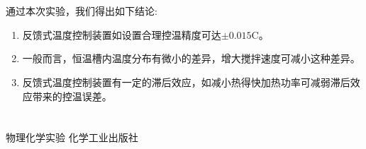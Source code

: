 ﻿\documentclass[10.5pt]{ctexart}
\begin{document}
\section{\textbf{}}

通过本次实验，我们得出如下结论:
\begin{enumerate}
\item 反馈式温度控制装置如设置合理控温精度可达$\pm0.015$\degree C。
\item 一般而言，恒温槽内温度分布有微小的差异，增大搅拌速度可减小这种差异。
\item 反馈式温度控制装置有一定的滞后效应，如减小热得快加热功率可减弱滞后效应带来的控温误差。
\end{enumerate}

\section{\textbf{}}
\begin{thebibliography}{}
物理化学实验 \quad 化学工业出版社
\end{thebibliography}
\end{document}
